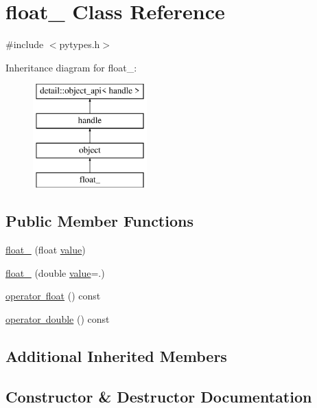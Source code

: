 \hypertarget{classfloat__}{}\section{float\+\_\+ Class Reference}
\label{classfloat__}


{\ttfamily \#include $<$pytypes.\+h$>$}

Inheritance diagram for float\+\_\+\+:\begin{figure}[H]
\begin{center}
\leavevmode
\includegraphics[height=4.000000cm]{classfloat__}
\end{center}
\end{figure}
\subsection*{Public Member Functions}
\begin{DoxyCompactItemize}
\item 
\mbox{\hyperlink{classfloat___a33fc1fb35fa5bb113801fce4e202a9f7}{float\+\_\+}} (float \mbox{\hyperlink{_s_d_l__opengl__glext_8h_a8ad81492d410ff2ac11f754f4042150f}{value}})
\item 
\mbox{\hyperlink{classfloat___ab7d3e2fa041e2aa97a415b256875370f}{float\+\_\+}} (double \mbox{\hyperlink{_s_d_l__opengl__glext_8h_a8ad81492d410ff2ac11f754f4042150f}{value}}=.)
\item 
\mbox{\hyperlink{classfloat___ab4cf97a2b358f2ba95564d43e56ceb1f}{operator float}} () const
\item 
\mbox{\hyperlink{classfloat___a52be34dd629fc1f857de0cc72cb4e15c}{operator double}} () const
\end{DoxyCompactItemize}
\subsection*{Additional Inherited Members}


\subsection{Constructor \& Destructor Documentation}
\mbox{\label{classfloat___a33fc1fb35fa5bb113801fce4e202a9f7}} 
